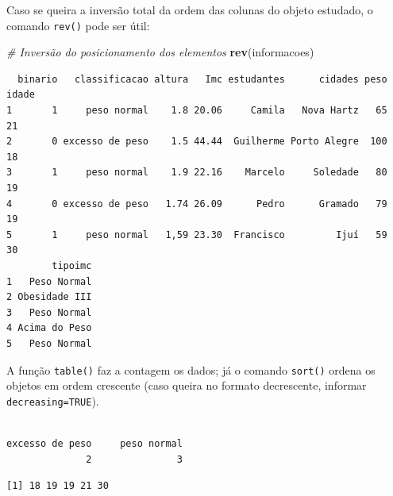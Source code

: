 \documentclass[12pt,brazil,oneside]{book}
\newenvironment{Shaded}{\begin{snugshade}}{\end{snugshade}}
\newcommand{\CommentTok}[1]{\textcolor[rgb]{0.56,0.35,0.01}{\textit{#1}}}
\newcommand{\KeywordTok}[1]{\textcolor[rgb]{0.13,0.29,0.53}{\textbf{#1}}}
\newcommand{\NormalTok}[1]{#1}
\newcommand{\OperatorTok}[1]{\textcolor[rgb]{0.81,0.36,0.00}{\textbf{#1}}}
\begin{document}
Caso se queira a inversão total da ordem das colunas do objeto estudado,
o comando \texttt{rev()} pode ser útil:

\begin{Shaded}
\begin{Highlighting}[]
\CommentTok{# Inversão do posicionamento dos elementos}
\KeywordTok{rev}\NormalTok{(informacoes)}
\end{Highlighting}
\end{Shaded}

\begin{verbatim}
  binario   classificacao altura   Imc estudantes      cidades peso idade
1       1     peso normal    1.8 20.06     Camila   Nova Hartz   65    21
2       0 excesso de peso    1.5 44.44  Guilherme Porto Alegre  100    18
3       1     peso normal    1.9 22.16    Marcelo     Soledade   80    19
4       0 excesso de peso   1.74 26.09      Pedro      Gramado   79    19
5       1     peso normal   1,59 23.30  Francisco         Ijuí   59    30
        tipoimc
1   Peso Normal
2 Obesidade III
3   Peso Normal
4 Acima do Peso
5   Peso Normal
\end{verbatim}

A função \texttt{table()} faz a contagem os dados; já o comando
\texttt{sort()} ordena os objetos em ordem crescente (caso queira no
formato decrescente, informar \texttt{decreasing=TRUE}).

\begin{Shaded}
\end{Shaded}

\begin{verbatim}

excesso de peso     peso normal 
              2               3 
\end{verbatim}

\begin{Shaded}
\end{Shaded}

\begin{verbatim}
[1] 18 19 19 21 30
\end{verbatim}
\end{document}
